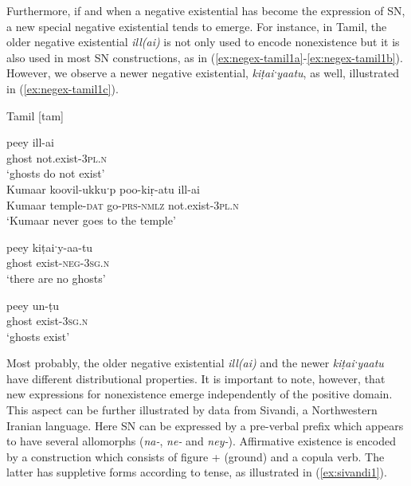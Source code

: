 \documentclass[output=paper,chinesefont,colorlinks,citecolor=brown]{langscibook}
\begin{document}
Furthermore, if and when a negative existential has become the expression of SN, a new special negative existential tends to emerge. For instance, in Tamil, the older negative existential \textit{ill(ai)} is not only used to encode nonexistence but it is also used in most SN constructions, as in (\ref{ex:negex-tamil1a}-\ref{ex:negex-tamil1b}). However, we observe a newer negative existential, \textit{kiṭaiˑyaatu}, as well, illustrated in (\ref{ex:negex-tamil1c}).

\newpage
\begin{exe}
\ex Tamil [tam] \citet[230, 81]{lehmannGrammarModernTamil1993} \label{ex:negex-tamil}
\begin{xlist}
\ex \label{ex:negex-tamil1a}
\gll peey ill-ai\\
 ghost not.exist-\textsc{3pl.n}\\
 \glt  ‘ghosts do not exist’\\
 
 \ex \label{ex:negex-tamil1b}
 \gll Kumaar koovil-ukkuˑp poo-kiṛ-atu ill-ai\\
  Kumaar temple-\textsc{dat} go-\textsc{prs-nmlz} not.exist-\textsc{3pl.n}\\
  \glt ‘Kumaar never goes to the temple’
  
\ex \label{ex:negex-tamil1c}
\gll peey kiṭaiˑy-aa-tu\\
ghost exist-\textsc{neg}-\textsc{3sg.n}\\
\glt ‘there are no ghosts'

\ex \label{ex:negex-tamil1d}
\gll peey un-ṭu\\
ghost exist-\textsc{3sg.n}\\
\glt ‘ghosts exist’
\end{xlist}
\end{exe}
Most probably, the older negative existential \textit{ill(ai)} and the newer \textit{kiṭaiˑyaatu} have different distributional properties. It is important to note, however, that new expressions for nonexistence emerge independently of the positive domain. This aspect can be further illustrated by data from Sivandi, a Northwestern Iranian language.  Here SN can be expressed by a pre-verbal prefix which appears to have several allomorphs (\textit{na-}, \textit{ne-} and \textit{ney-}). Affirmative existence is encoded by a construction which consists of figure + (ground) and a copula verb. The latter has suppletive forms according to tense, as illustrated in (\ref{ex:sivandi1}). 
\end{document}
